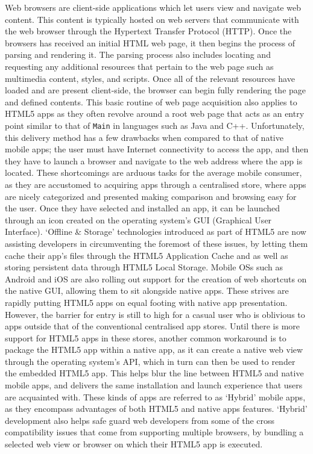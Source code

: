 \documentclass[final]{cmpreport}
\begin{document}
Web browsers are client-side applications which let users view and navigate web content. This content is typically hosted on web servers that communicate with the web browser through the Hypertext Transfer Protocol (HTTP). Once the browsers has received an initial HTML web page, it then begins the process of parsing and rendering it. The parsing process also includes locating and requesting any additional resources that pertain to the web page such as multimedia content, styles, and scripts. Once all of the relevant resources have loaded and are present client-side, the browser can begin fully rendering the page and defined contents. This basic routine of web page acquisition also applies to HTML5 apps as they often revolve around a root web page that acts as an entry point similar to that of \texttt{Main} in languages such as Java and C++. Unfortunately, this delivery method has a few drawbacks when compared to that of native mobile apps; the user must have Internet connectivity to access the app, and then they have to launch a browser and navigate to the web address where the app is located. These shortcomings are arduous tasks for the average mobile consumer, as they are accustomed to acquiring apps through a centralised store, where apps are nicely categorized and presented making comparison and browsing easy for the user. Once they have selected and installed an app, it can be launched through an icon created on the operating system's GUI (Graphical User Interface). `Offline \& Storage' technologies introduced as part of HTML5 are now assisting developers in circumventing the foremost of these issues, by letting them cache their app's files through the HTML5 Application Cache and as well as storing persistent data through HTML5 Local Storage. Mobile OSs such as Android and iOS are also rolling out support for the creation of web shortcuts on the native GUI, allowing them to sit alongside native apps. These strives are rapidly putting HTML5 apps on equal footing with native app presentation. However, the barrier for entry is still to high for a casual user who is oblivious to apps outside that of the conventional centralised app stores. Until there is more support for HTML5 apps in these stores, another common workaround is to package the HTML5 app within a native app, as it can create a native web view through the operating system's API, which in turn can then be used to render the embedded HTML5 app. This helps blur the line between HTML5 and native mobile apps, and delivers the same installation and launch experience that users are acquainted with. These kinds of apps are referred to as `Hybrid' mobile apps, as they encompass advantages of both HTML5 and native apps features. `Hybrid' development also helps safe guard web developers from some of the cross compatibility issues that come from supporting multiple browsers, by bundling a selected web view or browser on which their HTML5 app is executed.
\end{document}
